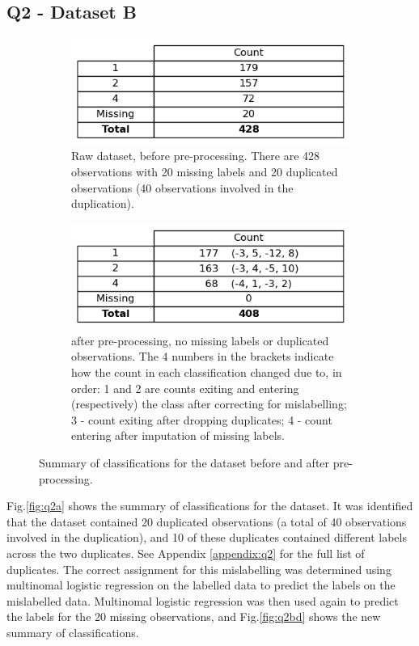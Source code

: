 
\subsection{Q2 - Dataset B}\label{subsec:dataset-b}
    \begin{figure}
    \centering
    \begin{subfigure}{0.9\textwidth}
      \centering
      \includegraphics[width=.55\linewidth]{./figures/q2a}
      \caption{Raw  dataset, before pre-processing. There are 428 observations with 20 missing
        labels and 20 duplicated observations (40 observations involved in the duplication).}
      \label{fig:q2a}
    \end{subfigure}%
    \hfill
    \begin{subfigure}{0.9\textwidth}
      \centering
      \includegraphics[width=0.55\linewidth]{./figures/q2b_q2d}
      \caption{ after pre-processing, no missing labels or duplicated observations.
        The 4 numbers in the brackets indicate how the count in each classification changed due to, in order: 1 and 2
        are counts exiting and entering (respectively) the class after correcting for mislabelling; 3 -
        count exiting after dropping duplicates; 4 - count entering after imputation of missing labels.}
      \label{fig:q2bd}
    \end{subfigure}
    \caption{Summary of classifications for the  dataset before and after pre-processing.}
    \label{fig:q2abd}
    \end{figure}

    Fig.\eqref{fig:q2a} shows the summary of classifications for the  dataset.
    It was identified that the dataset contained 20 duplicated observations (a total of 40 observations involved in the
    duplication), and 10 of these duplicates contained different labels across the two duplicates. See Appendix
    \ref{appendix:q2} for the full list of duplicates.
    The correct assignment for this mislabelling was determined using multinomal logistic regression on the labelled data
    to predict the labels on the mislabelled data.
    Multinomal logistic regression was then used again to predict the labels for the 20 missing observations, and
    Fig.\eqref{fig:q2bd} shows the new summary of classifications.

